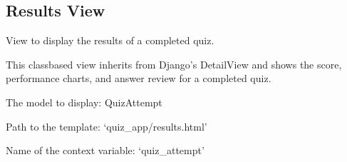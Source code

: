 \documentclass[letterpaper,10pt,english]{sphinxmanual}
\begin{document}
\subsection{Results View}
\label{\detokenize{views:results-view}}

\begin{fulllineitems}
\label{\detokenize{views:ResultsView}}
\pysigstartsignatures
{}
\pysigstopsignatures
\sphinxAtStartPar
View to display the results of a completed quiz.

\sphinxAtStartPar
This class\sphinxhyphen{}based view inherits from Django’s DetailView and shows
the score, performance charts, and answer review for a completed quiz.

\begin{fulllineitems}
\label{\detokenize{views:ResultsView.model}}
\pysigstartsignatures
{}
\pysigstopsignatures
\sphinxAtStartPar
The model to display: QuizAttempt

\end{fulllineitems}


\begin{fulllineitems}
\label{\detokenize{views:ResultsView.template_name}}
\pysigstartsignatures
{}
\pysigstopsignatures
\sphinxAtStartPar
Path to the template: ‘quiz\_app/results.html’

\end{fulllineitems}


\begin{fulllineitems}
\label{\detokenize{views:ResultsView.context_object_name}}
\pysigstartsignatures
{}
\pysigstopsignatures
\sphinxAtStartPar
Name of the context variable: ‘quiz\_attempt’


\end{fulllineitems}
\end{fulllineitems}
\end{document}
